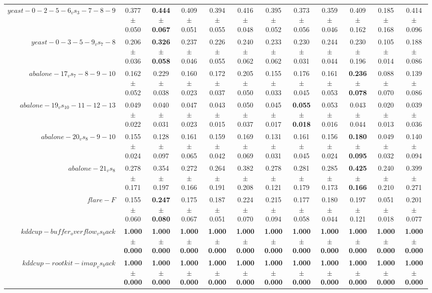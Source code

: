 \begin{table}[!ht]
{\begin{tabular}{r c c c c c c c c c c c}
$yeast-0-2-5-6_vs_3-7-8-9$ & 0.377 $\pm$ 0.050 & \textbf{0.444 $\pm$ 0.067} & 0.409 $\pm$ 0.051 & 0.394 $\pm$ 0.055 & 0.416 $\pm$ 0.048 & 0.395 $\pm$ 0.052 & 0.373 $\pm$ 0.056 & 0.359 $\pm$ 0.046 & 0.409 $\pm$ 0.162 & 0.185 $\pm$ 0.168 & 0.414 $\pm$ 0.096 \\
$yeast-0-3-5-9_vs_7-8$ & 0.206 $\pm$ 0.036 & \textbf{0.326 $\pm$ 0.058} & 0.237 $\pm$ 0.046 & 0.226 $\pm$ 0.055 & 0.240 $\pm$ 0.062 & 0.233 $\pm$ 0.062 & 0.230 $\pm$ 0.031 & 0.244 $\pm$ 0.044 & 0.230 $\pm$ 0.196 & 0.105 $\pm$ 0.014 & 0.188 $\pm$ 0.086 \\
$abalone-17_vs_7-8-9-10$ & 0.162 $\pm$ 0.052 & 0.229 $\pm$ 0.038 & 0.160 $\pm$ 0.023 & 0.172 $\pm$ 0.037 & 0.205 $\pm$ 0.050 & 0.155 $\pm$ 0.033 & 0.176 $\pm$ 0.045 & 0.161 $\pm$ 0.053 & \textbf{0.236 $\pm$ 0.078} & 0.088 $\pm$ 0.070 & 0.139 $\pm$ 0.086 \\
$abalone-19_vs_10-11-12-13$ & 0.049 $\pm$ 0.022 & 0.040 $\pm$ 0.031 & 0.047 $\pm$ 0.023 & 0.043 $\pm$ 0.015 & 0.050 $\pm$ 0.037 & 0.045 $\pm$ 0.017 & \textbf{0.055 $\pm$ 0.018} & 0.053 $\pm$ 0.016 & 0.043 $\pm$ 0.044 & 0.020 $\pm$ 0.013 & 0.039 $\pm$ 0.036 \\
$abalone-20_vs_8-9-10$ & 0.155 $\pm$ 0.024 & 0.128 $\pm$ 0.097 & 0.161 $\pm$ 0.065 & 0.159 $\pm$ 0.042 & 0.169 $\pm$ 0.069 & 0.131 $\pm$ 0.031 & 0.161 $\pm$ 0.045 & 0.156 $\pm$ 0.024 & \textbf{0.180 $\pm$ 0.095} & 0.049 $\pm$ 0.032 & 0.140 $\pm$ 0.094 \\
$abalone-21_vs_8$ & 0.278 $\pm$ 0.171 & 0.354 $\pm$ 0.197 & 0.272 $\pm$ 0.166 & 0.264 $\pm$ 0.191 & 0.382 $\pm$ 0.208 & 0.278 $\pm$ 0.121 & 0.281 $\pm$ 0.179 & 0.285 $\pm$ 0.173 & \textbf{0.425 $\pm$ 0.166} & 0.240 $\pm$ 0.210 & 0.399 $\pm$ 0.271 \\
$flare-F$ & 0.155 $\pm$ 0.060 & \textbf{0.247 $\pm$ 0.080} & 0.175 $\pm$ 0.067 & 0.187 $\pm$ 0.051 & 0.224 $\pm$ 0.070 & 0.215 $\pm$ 0.094 & 0.177 $\pm$ 0.058 & 0.180 $\pm$ 0.044 & 0.197 $\pm$ 0.121 & 0.051 $\pm$ 0.018 & 0.201 $\pm$ 0.077 \\
$kddcup-buffer_overflow_vs_back$ & \textbf{1.000 $\pm$ 0.000} & \textbf{1.000 $\pm$ 0.000} & \textbf{1.000 $\pm$ 0.000} & \textbf{1.000 $\pm$ 0.000} & \textbf{1.000 $\pm$ 0.000} & \textbf{1.000 $\pm$ 0.000} & \textbf{1.000 $\pm$ 0.000} & \textbf{1.000 $\pm$ 0.000} & \textbf{1.000 $\pm$ 0.000} & \textbf{1.000 $\pm$ 0.000} & \textbf{1.000 $\pm$ 0.000} \\
$kddcup-rootkit-imap_vs_back$ & \textbf{1.000 $\pm$ 0.000} & \textbf{1.000 $\pm$ 0.000} & \textbf{1.000 $\pm$ 0.000} & \textbf{1.000 $\pm$ 0.000} & \textbf{1.000 $\pm$ 0.000} & \textbf{1.000 $\pm$ 0.000} & \textbf{1.000 $\pm$ 0.000} & \textbf{1.000 $\pm$ 0.000} & \textbf{1.000 $\pm$ 0.000} & \textbf{1.000 $\pm$ 0.000} & \textbf{1.000 $\pm$ 0.000} \\

\end{tabular}}
\end{table}
